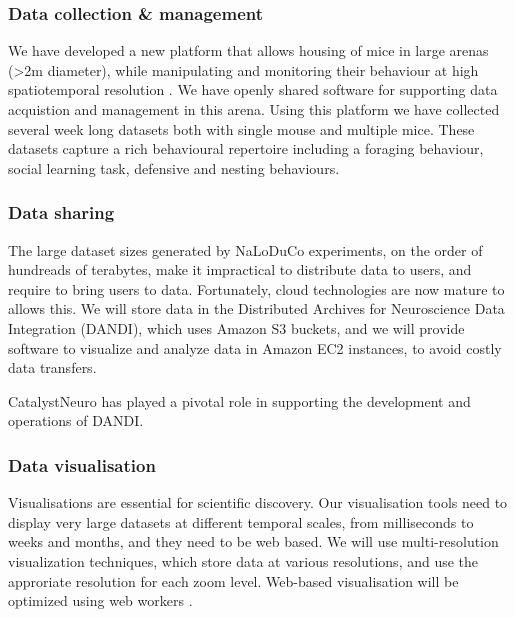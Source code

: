 \subsubsection{Data collection \& management}

We have developed a new platform that allows housing of mice in large arenas
(\textgreater 2m diameter), while manipulating and monitoring their behaviour
at high spatiotemporal resolution \citep[Figure~\ref{fig:arena}, ][]{campagnerEtAl24}.
%
We have openly shared software for supporting data acquistion
\citep{aeonacquisition} and management \citep{aeonmecha} in this
arena.
%
Using this platform we have collected several week long datasets both with
single mouse and multiple mice.
%
These datasets capture a rich behavioural repertoire including a foraging
behaviour,  social learning task, defensive and nesting behaviours.



\subsubsection{Data sharing}

The large dataset sizes generated by NaLoDuCo experiments, on the order of
hundreads of terabytes,  make it impractical to distribute data to users, and
require to bring users to data. Fortunately, cloud technologies are now mature
to allows this.
%
We will store data in the Distributed Archives for Neuroscience Data
Integration (DANDI), which uses Amazon S3 buckets, and we will provide software
to visualize and analyze data in Amazon EC2 instances, to avoid costly data
transfers.

CatalystNeuro has played a pivotal role in supporting the development and
operations of DANDI.

\subsubsection{Data visualisation}

Visualisations are essential for scientific discovery. Our visualisation tools
need to display very large datasets at different temporal scales, from
milliseconds to weeks and months, and they need to be web based.
%
We will use multi-resolution visualization techniques, which store data at
various resolutions, and use the approriate resolution for each zoom level.
%
Web-based visualisation will be optimized using web workers
\citep{webWorkers}.

